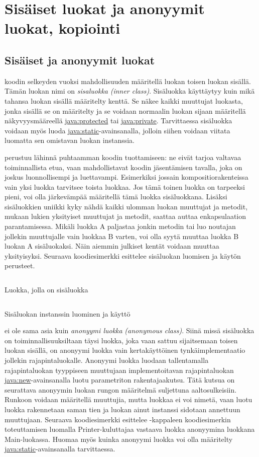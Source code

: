\documentclass{tufte-book}
\newcommand{\eng}[1]{\textit{(#1)}}
\newcommand{\new}[1]{\textit{\gls{#1}}}
\newcommand{\neweng}[2]{\new{#1} \eng{#2}}
\newcommand{\java}[1]{\underline{\gls{java:#1}}}
\newcommand{\code}[3]{
\begin{listing}
    \inputminted{java}{OhjelmointiopasEsimerkit/src/#1/#2.java}
    \caption{#3}
    \label{Java-#1-#2}
\end{listing}
}
\begin{document}
\chapter{Sisäiset luokat ja anonyymit luokat, kopiointi}
\label{innerClasses+copying}

\section{Sisäiset ja anonyymit luokat}
\label{innerClasses}

 koodin selkeyden vuoksi mahdollisuuden määritellä luokan toisen luokan
sisällä. Tämän luokan nimi on \neweng{sisaluokka}{inner class}. Sisäluokka käyttäytyy kuin mikä
tahansa luokan sisällä määritelty kenttä. Se näkee kaikki muuttujat luokasta, jonka sisällä se on 
määritelty ja se voidaan normaalin luokan sijaan määritellä näkyvyysmääreellä \java{protected} tai
\java{private}. Tarvittaessa sisäluokka voidaan myös luoda \java{static}-avainsanalla, jolloin
siihen voidaan viitata luomatta sen omistavan luokan instanssia.

 perustuu lähinnä puhtaamman koodin tuottamiseen: ne eivät
tarjoa valtavaa toiminnallista etua, vaan mahdollistavat koodin jäsentämisen tavalla, joka on
joskus luonnollisempi ja luettavampi. Esimerkiksi jossain \gls{kompositio}rakenteissa vain
yksi luokka tarvitsee toista luokkaa. Jos tämä toinen luokka on tarpeeksi pieni, voi olla
järkevämpää määritellä tämä luokka sisäluokkana. Lisäksi sisäluokkien uniikki kyky nähdä kaikki 
ulomman luokan muuttujat ja metodit, mukaan lukien yksityiset muuttujat ja metodit, saattaa auttaa
enkapsulaation parantamisessa. Mikäli luokka A paljastaa jonkin metodin tai luo noutajan jollekin
muuttujalle vain luokkaa B varten, voi olla syytä muuttaa luokka B luokan A sisäluokaksi. Näin
aiemmin julkiset kentät voidaan muuttaa yksityisyksi. Seuraava koodiesimerkki esittelee
sisäluokan luomisen ja käytön perusteet.

\code{week11/innerclassexample}{OuterClass}{Luokka, jolla on sisäluokka}
\code{week11/innerclassexample}{InnerClassesExample}{Sisäluokan instanssin luominen ja käyttö}

 ei ole sama asia kuin \neweng{anonyymi luokka}{anonymous class}. Siinä
missä sisäluokka on toiminnallisuuksiltaan täysi luokka, joka vaan sattuu sijaitsemaan toisen 
luokan sisällä, on anonyymi luokka vain kertakäyttöinen tynkäimplementaatio jollekin
rajapintaluokalle. Anonyymi luokka luodaan tallentamalla rajapintaluokan tyyppiseen muuttujaan
implementoitavan rajapintaluokan \java{new}-avainsanalla luotu parametriton rakentajaakutsu. Tätä
kutsua on seurattava anonyymin luokan rungon määritelmä suljettuna aaltosulkeisiin. Runkoon
voidaan määritellä muuttujia, mutta luokkaa ei voi nimetä, vaan luotu luokka rakennetaan saman
tien ja luokan ainut instanssi sidotaan annettuun muuttujaan. Seuraava koodiesimerkki esittelee
-kappaleen koodiesimerkin toteuttamisen luomalla Printer-kuluttajaa vastaava
luokka anonyymina luokkana Main-luokassa. Huomaa myös kuinka anonyymi luokka voi olla
määritelty \java{static}-avainsanalla tarvittaessa.
\end{document}

